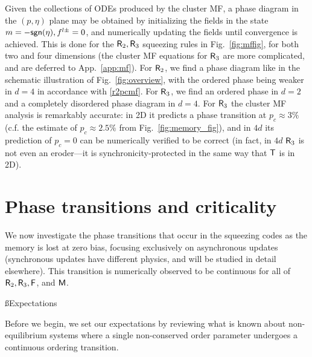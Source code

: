 \documentclass[pra,aps,twocolumn,groupedaddress,superscriptaddress,nofootinbib,preprintnumbers]{revtex4-2}
\begin{document}
	Given the collections of ODEs produced by the cluster MF, a phase diagram in the $(p,\eta)$ plane may be obtained by initializing the fields in the state $m=-{\sf sgn}(\eta),f^{l\pm} = 0$, and numerically updating the fields until convergence is achieved. 
	This is done for the $\mathsf{R}_2,\mathsf{R}_3$ squeezing rules in Fig.~\ref{fig:mffig}, for both two and four dimensions (the cluster MF equations for $\mathsf{R}_3$ are more complicated, and are deferred to App.~\ref{app:mf}). For $\mathsf{R}_2$, we find a phase diagram like in the schematic illustration of Fig.~\ref{fig:overview}, with the ordered phase being weaker in $d=4$ in accordance with \eqref{r2pcmf}. For $\mathsf{R}_3$, we find an ordered phase in $d=2$ and a completely disordered phase diagram in $d=4$. For $\mathsf{R}_3$ the cluster MF analysis is remarkably accurate: in 2D it predicts a phase transition at $p_{c} \approx 3\%$ (c.f. the estimate of $p_c\approx 2.5\%$ from Fig.~\ref{fig:memory_fig}), and in $4d$ its prediction of $p_c = 0$ can be numerically verified to be correct (in fact, in $4d$ $\mathsf{R}_3$ is not even an eroder---it is synchronicity-protected in the same way that $\mathsf{T}$ is in 2D).  
	
	
	\section{Phase transitions and criticality}\label{sec:crit}
	
	We now investigate the phase transitions that occur in the squeezing codes as the memory is lost at zero bias, focusing exclusively on asynchronous updates (synchronous updates have different physics, and will be studied in detail elsewhere). This transition is numerically observed to be continuous for all of  $\mathsf{R}_2,\mathsf{R}_3,\mathsf{F}$, and $\mathsf{M}$. 
	
	\ss{Expectations}
	
	Before we begin, we set our expectations by reviewing what is known about non-equilibrium systems where a single non-conserved order parameter undergoes a continuous ordering transition.
	
\end{document}
